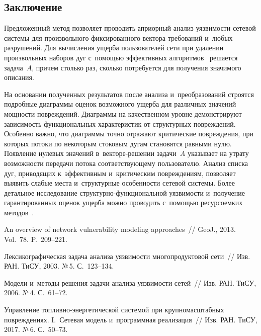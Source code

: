 \begin{multicols}{2}
\section{Заключение}

Предложенный метод позволяет проводить априорный анализ уязвимости сетевой 
системы для произвольного фиксированного вектора требований и~любых разрушений.
Для вычисления ущерба  пользователей сети при  удалении произвольных наборов   
дуг с~помощью эффективных алгоритмов~\cite{Yen} решается задача~$A$, причем 
столько раз, сколько потребуется для получения значимого описания.  

На основании полученных   результатов после анализа и~преобразований  
строятся  подробные  диаграм\-мы  оценок  возможного  ущерба для различных  
значений мощности повреждений.
Диаграммы на качественном уровне демонстрируют\linebreak
 зависимость функциональных 
характеристик от структурных повреждений. Особенно важно,  что  диаграммы точно 
отражают критические по\-вреж\-де\-ния, при которых потоки по некоторым стоковым дугам 
становятся равными нулю. Появление   нулевых значений в~век\-то\-ре-ре\-ше\-нии  задачи~$A$  
указывает на утрату  возможности передачи потока соответствующему пользователю.  
Анализ списка дуг, приводящих к~эффективным и~критическим повреждениям, позволяет 
выявить  слабые места и~структурные особенности сетевой системы.
Более детальное  исследование  струк\-тур\-но-функ\-цио\-наль\-ной уяз\-ви\-мости  и~получение 
гарантированных оценок ущерба можно проводить с~помощью ресурсоемких 
методов~\cite{MalInf17}. 

\vspace*{-6pt}


{\small\frenchspacing
 {%
 \begin{thebibliography}{9}

  
An overview of network vulnerability modeling approaches~// GeoJ., 2013. 
Vol.~78. P.~209--221.

  Лексикографическая задача анализа уязвимости
многопродуктовой сети~// Изв. РАН. \mbox{ТиСУ}, 2003. №\,5. С.~123--134.

  Модели и~методы решения задачи анализа
уязвимости сетей~// Изв. РАН. ТиСУ, 2006. №\,4. С.~61--72.

  
Управление   топ\-лив\-но-энер\-ге\-ти\-че\-ской  сис\-те\-мой  
при  крупномасштабных повреждениях. I.~Сетевая  модель  и~программная реализация~// 
Изв. РАН. ТиСУ, 2017. №\,6. С.~50--73.


\end{thebibliography}}}
\end{multicols}
